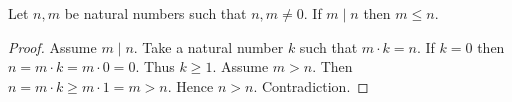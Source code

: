 \documentclass[10pt]{article}
\begin{document}
  \begin{forthel}
    \begin{proposition}[id=ARITHMETIC_07_2187144577679360,printid]
      Let $n, m$ be natural numbers such that $n, m \neq 0$.
      If $m \mid n$ then $m \leq n$.
    \end{proposition}
    \begin{proof}
      Assume $m \mid n$.
      Take a natural number $k$ such that $m \cdot k = n$.
      If $k = 0$ then
      $n
        = m \cdot k
        = m \cdot 0
        = 0$.
      Thus $k \geq 1$.
      Assume $m > n$.
      Then $n
        = m \cdot k
        \geq m \cdot 1
        = m
        > n$.
      Hence $n > n$.
      Contradiction.
    \end{proof}
  \end{forthel}
\end{document}
